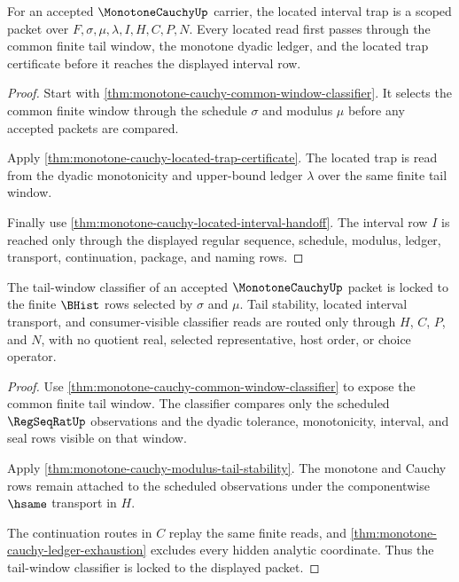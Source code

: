 \begin{theorem}
\label{thm:monotone-cauchy-located-scope-package}
For an accepted $\MonotoneCauchyUp$ carrier, the located interval trap is a
scoped packet over $F,\sigma,\mu,\lambda,I,H,C,P,N$. Every located read first
passes through the common finite tail window, the monotone dyadic ledger, and
the located trap certificate before it reaches the displayed interval row.
\end{theorem}
\begin{proof}
Start with \autoref{thm:monotone-cauchy-common-window-classifier}. It selects
the common finite window through the schedule $\sigma$ and modulus $\mu$ before
any accepted packets are compared.

Apply \autoref{thm:monotone-cauchy-located-trap-certificate}. The located trap
is read from the dyadic monotonicity and upper-bound ledger $\lambda$ over the
same finite tail window.

Finally use \autoref{thm:monotone-cauchy-located-interval-handoff}. The
interval row $I$ is reached only through the displayed regular sequence,
schedule, modulus, ledger, transport, continuation, package, and naming rows.
\end{proof}

\begin{theorem}
\label{thm:monotone-cauchy-tail-window-scope-lock}
The tail-window classifier of an accepted $\MonotoneCauchyUp$ packet is locked
to the finite $\BHist$ rows selected by $\sigma$ and $\mu$. Tail stability,
located interval transport, and consumer-visible classifier reads are routed
only through $H$, $C$, $P$, and $N$, with no quotient real, selected
representative, host order, or choice operator.
\end{theorem}
\begin{proof}
Use \autoref{thm:monotone-cauchy-common-window-classifier} to expose the common
finite tail window. The classifier compares only the scheduled
$\RegSeqRatUp$ observations and the dyadic tolerance, monotonicity, interval,
and seal rows visible on that window.

Apply \autoref{thm:monotone-cauchy-modulus-tail-stability}. The monotone and
Cauchy rows remain attached to the scheduled observations under the
componentwise $\hsame$ transport in $H$.

The continuation routes in $C$ replay the same finite reads, and
\autoref{thm:monotone-cauchy-ledger-exhaustion} excludes every hidden analytic
coordinate. Thus the tail-window classifier is locked to the displayed packet.
\end{proof}

